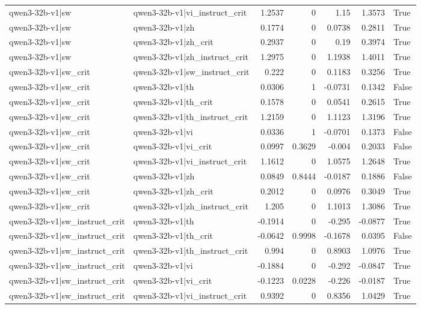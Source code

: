 \begin{table}
\begin{tabular}{l l r r r r l}
qwen3-32b-v1|sw & qwen3-32b-v1|vi_instruct_crit & 1.2537 & 0 & 1.15 & 1.3573 & True \\
qwen3-32b-v1|sw & qwen3-32b-v1|zh & 0.1774 & 0 & 0.0738 & 0.2811 & True \\
qwen3-32b-v1|sw & qwen3-32b-v1|zh_crit & 0.2937 & 0 & 0.19 & 0.3974 & True \\
qwen3-32b-v1|sw & qwen3-32b-v1|zh_instruct_crit & 1.2975 & 0 & 1.1938 & 1.4011 & True \\
qwen3-32b-v1|sw_crit & qwen3-32b-v1|sw_instruct_crit & 0.222 & 0 & 0.1183 & 0.3256 & True \\
qwen3-32b-v1|sw_crit & qwen3-32b-v1|th & 0.0306 & 1 & -0.0731 & 0.1342 & False \\
qwen3-32b-v1|sw_crit & qwen3-32b-v1|th_crit & 0.1578 & 0 & 0.0541 & 0.2615 & True \\
qwen3-32b-v1|sw_crit & qwen3-32b-v1|th_instruct_crit & 1.2159 & 0 & 1.1123 & 1.3196 & True \\
qwen3-32b-v1|sw_crit & qwen3-32b-v1|vi & 0.0336 & 1 & -0.0701 & 0.1373 & False \\
qwen3-32b-v1|sw_crit & qwen3-32b-v1|vi_crit & 0.0997 & 0.3629 & -0.004 & 0.2033 & False \\
qwen3-32b-v1|sw_crit & qwen3-32b-v1|vi_instruct_crit & 1.1612 & 0 & 1.0575 & 1.2648 & True \\
qwen3-32b-v1|sw_crit & qwen3-32b-v1|zh & 0.0849 & 0.8444 & -0.0187 & 0.1886 & False \\
qwen3-32b-v1|sw_crit & qwen3-32b-v1|zh_crit & 0.2012 & 0 & 0.0976 & 0.3049 & True \\
qwen3-32b-v1|sw_crit & qwen3-32b-v1|zh_instruct_crit & 1.205 & 0 & 1.1013 & 1.3086 & True \\
qwen3-32b-v1|sw_instruct_crit & qwen3-32b-v1|th & -0.1914 & 0 & -0.295 & -0.0877 & True \\
qwen3-32b-v1|sw_instruct_crit & qwen3-32b-v1|th_crit & -0.0642 & 0.9998 & -0.1678 & 0.0395 & False \\
qwen3-32b-v1|sw_instruct_crit & qwen3-32b-v1|th_instruct_crit & 0.994 & 0 & 0.8903 & 1.0976 & True \\
qwen3-32b-v1|sw_instruct_crit & qwen3-32b-v1|vi & -0.1884 & 0 & -0.292 & -0.0847 & True \\
qwen3-32b-v1|sw_instruct_crit & qwen3-32b-v1|vi_crit & -0.1223 & 0.0228 & -0.226 & -0.0187 & True \\
qwen3-32b-v1|sw_instruct_crit & qwen3-32b-v1|vi_instruct_crit & 0.9392 & 0 & 0.8356 & 1.0429 & True \\

\end{tabular}
\end{table}
